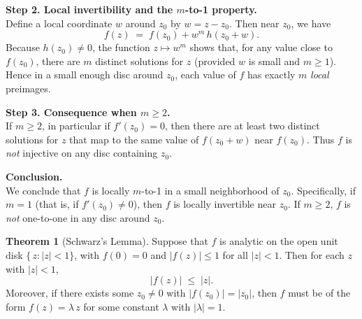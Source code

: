 \documentclass[12pt]{article}
\theoremstyle{definition} %
\newtheorem{theorem}{Theorem}
\theoremstyle{plain} %
\begin{document}
\medskip

\noindent
\textbf{Step 2. Local invertibility and the $m$-to-1 property.}\\
Define a local coordinate $w$ around $z_0$ by $w = z - z_0$. Then near $z_0$, we have
\[
  f(z) \;=\; f(z_0) + w^m \,h(z_0 + w).
\]
Because $h(z_0) \neq 0$, the function $z \mapsto w^m$ shows that, for any value close to $f(z_0)$,
there are $m$ distinct solutions for $z$ (provided $w$ is small and $m \ge 1$). Hence in a small
enough disc around $z_0$, each value of $f$ has exactly $m$ \emph{local} preimages.

\medskip

\noindent
\textbf{Step 3. Consequence when $m \ge 2$.}\\
If $m \ge 2$, in particular if $f'(z_0) = 0$, then there are at least two distinct solutions for $z$
that map to the same value of $f(z_0 + w)$ near $f(z_0)$. Thus $f$ is \emph{not} injective on any
disc containing $z_0$. 

\medskip

\noindent
\textbf{Conclusion.}\\
We conclude that $f$ is locally $m$-to-1 in a small neighborhood of $z_0$. Specifically, if $m=1$
(that is, if $f'(z_0) \neq 0$), then $f$ is locally invertible near $z_0$. If $m \ge 2$, $f$ is
\emph{not} one-to-one in any disc around $z_0$.
\begin{theorem}[Schwarz's Lemma]
    Suppose that $f$ is analytic on the open unit disk $\{\, z : |z| < 1\}$, with $f(0) = 0$ 
    and $|f(z)| \le 1$ for all $|z| < 1$. Then for each $z$ with $|z|<1$,
    \[
       |f(z)| \;\le\; |z|.
    \]
    Moreover, if there exists some $z_0 \neq 0$ with $|f(z_0)| = |z_0|$, then $f$ must be of the form
    $f(z) = \lambda \, z$ for some constant $\lambda$ with $|\lambda| = 1$.
    \end{theorem}
    
\end{document}
